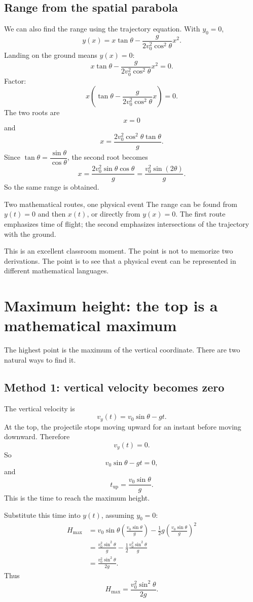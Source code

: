 \documentclass[11pt,a4paper]{article}
\begin{document}
\subsection{Range from the spatial parabola}

We can also find the range using the trajectory equation. With $y_0=0$,
\[
y(x)=x\tan\theta-\frac{g}{2v_0^2\cos^2\theta}x^2.
\]
Landing on the ground means $y(x)=0$:
\[
x\tan\theta-\frac{g}{2v_0^2\cos^2\theta}x^2=0.
\]
Factor:
\[
x\left(\tan\theta-\frac{g}{2v_0^2\cos^2\theta}x\right)=0.
\]
The two roots are
\[
x=0
\]
and
\[
x=\frac{2v_0^2\cos^2\theta\tan\theta}{g}.
\]
Since $\tan\theta=\dfrac{\sin\theta}{\cos\theta}$, the second root becomes
\[
x=\frac{2v_0^2\sin\theta\cos\theta}{g}=\frac{v_0^2\sin(2\theta)}{g}.
\]
So the same range is obtained.

\begin{principlebox}{Two mathematical routes, one physical event}
The range can be found from $y(t)=0$ and then $x(t)$, or directly from $y(x)=0$. The first route emphasizes time of flight; the second emphasizes intersections of the trajectory with the ground.
\end{principlebox}

This is an excellent classroom moment. The point is not to memorize two derivations. The point is to see that a physical event can be represented in different mathematical languages.

\newpage

\section{Maximum height: the top is a mathematical maximum}

The highest point is the maximum of the vertical coordinate. There are two natural ways to find it.

\subsection{Method 1: vertical velocity becomes zero}

The vertical velocity is
\[
v_y(t)=v_0\sin\theta-gt.
\]
At the top, the projectile stops moving upward for an instant before moving downward. Therefore
\[
v_y(t)=0.
\]
So
\[
v_0\sin\theta-gt=0,
\]
and
\[
\boxed{t_{\mathrm{up}}=\frac{v_0\sin\theta}{g}.}
\]
This is the time to reach the maximum height.

Substitute this time into $y(t)$, assuming $y_0=0$:
\begin{align*}
H_{\max}&=v_0\sin\theta\left(\frac{v_0\sin\theta}{g}\right)-\frac12g\left(\frac{v_0\sin\theta}{g}\right)^2 \\
&=\frac{v_0^2\sin^2\theta}{g}-\frac12\frac{v_0^2\sin^2\theta}{g} \\
&=\frac{v_0^2\sin^2\theta}{2g}.
\end{align*}
Thus
\[
\boxed{H_{\max}=\frac{v_0^2\sin^2\theta}{2g}.}
\]
\end{document}
